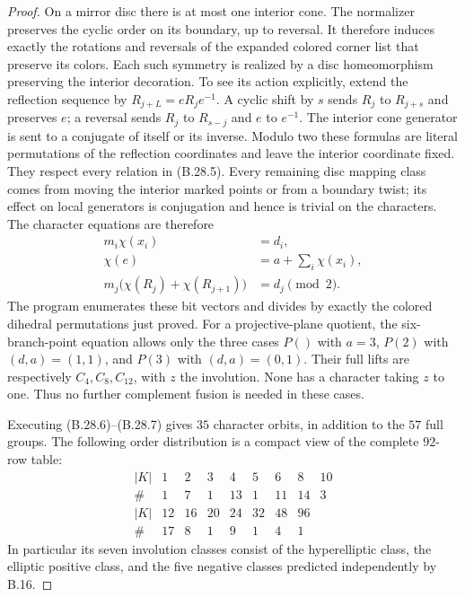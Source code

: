 \begin{proof}
On a mirror disc there is at most one interior cone.  The normalizer
preserves the cyclic order on its boundary, up to reversal.  It
therefore induces exactly the rotations and reversals of the
expanded colored corner list that preserve its colors.  Each such
symmetry is realized by a disc homeomorphism preserving the interior
decoration.  To see its action explicitly, extend the reflection
sequence by $R_{j+L}=eR_je^{-1}$.  A cyclic shift by $s$ sends
$R_j$ to $R_{j+s}$ and preserves $e$; a reversal sends $R_j$ to
$R_{s-j}$ and $e$ to $e^{-1}$.  The interior cone generator is sent
to a conjugate of itself or its inverse.  Modulo two these formulas
are literal permutations of the reflection coordinates and leave
the interior coordinate fixed.  They respect every relation in
(B.28.5).  Every remaining disc mapping class comes from moving the
interior marked points or from a boundary twist; its effect on local
generators is conjugation and hence is trivial on the characters.
The character equations are therefore
\[
 \begin{split}
 m_i\chi(x_i)&=d_i,\\
 \chi(e)&=a+\sum_i\chi(x_i),\\
 m_j\bigl(\chi(R_j)+\chi(R_{j+1})\bigr)&=d_j\pmod2.
 \end{split}
                                                        \tag{B.28.7}
\]
The program enumerates these bit vectors and divides by exactly the
colored dihedral permutations just proved.  For a projective-plane
quotient, the six-branch-point equation allows only the three cases
$P()$ with $a=3$, $P(2)$ with $(d,a)=(1,1)$, and $P(3)$ with
$(d,a)=(0,1)$.  Their full lifts are respectively $C_4,C_8,C_{12}$,
with $z$ the involution.  None has a character taking $z$ to one.
Thus no further complement fusion is needed in these cases.

Executing (B.28.6)--(B.28.7) gives $35$ character orbits, in addition
to the $57$ full groups.  The following order distribution is a
compact view of the complete $92$-row table:
\[
\begin{array}{c|rrrrrrrr}
 |K|&1&2&3&4&5&6&8&10\\\hline
 \#&1&7&1&13&1&11&14&3\\[2pt]
 |K|&12&16&20&24&32&48&96\\\hline
 \#&17&8&1&9&1&4&1
\end{array}                                             \tag{B.28.8}
\]
In particular its seven involution classes consist of the hyperelliptic
class, the elliptic positive class, and the five negative classes
predicted independently by B.16.


\end{proof}
